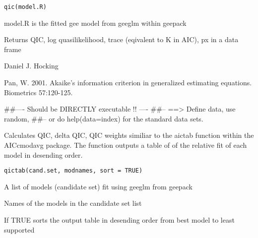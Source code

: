 \documentclass[a4paper]{book}
\begin{document}
%
\begin{Usage}
\begin{verbatim}
qic(model.R)
\end{verbatim}
\end{Usage}
%
\begin{Arguments}
\begin{ldescription}
\item[\code{model.R}] 
model.R is the fitted gee model from geeglm within geepack

\end{ldescription}
\end{Arguments}
%
\begin{Value}





Returns QIC, log quasilikelihood, trace (eqivalent to K in AIC), px in a data frame
\end{Value}
%
\begin{Author}\relax
Daniel J. Hocking
\end{Author}
%
\begin{References}\relax
Pan, W. 2001. Akaike's information criterion in generalized estimating equations. Biometrics 57:120-125.
\end{References}
%
\begin{Examples}
\begin{ExampleCode}
##---- Should be DIRECTLY executable !! ----
##-- ==>  Define data, use random,
##--	or do  help(data=index)  for the standard data sets.

\end{ExampleCode}
\end{Examples}
%
\begin{Description}\relax
Calculates QIC, delta QIC, QIC weights similiar to the aictab function within the AICcmodavg package. The function outputs a table of of the relative fit of each model in desending order.
\end{Description}
%
\begin{Usage}
\begin{verbatim}
qictab(cand.set, modnames, sort = TRUE)
\end{verbatim}
\end{Usage}
%
\begin{Arguments}
\begin{ldescription}
\item[\code{cand.set}] 
A list of models (candidate set) fit using geeglm from geepack

\item[\code{modnames}] 
Names of the models in the candidate set list

\item[\code{sort}] 
If TRUE sorts the output table in desending order from best model to least supported

\end{ldescription}
\end{Arguments}
\end{document}
